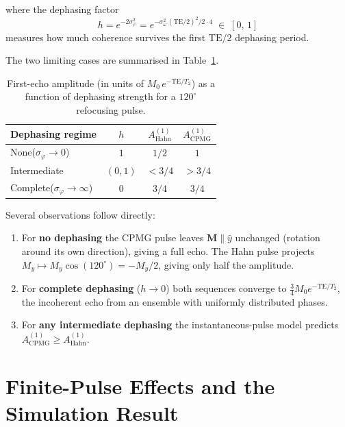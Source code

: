 \documentclass[11pt, a4paper]{article}
\begin{document}
where the dephasing factor
\begin{equation}
  h = e^{-2\sigma_\varphi^2} = e^{-\sigma_\omega^2\,(\mathrm{TE}/2)^2/2 \cdot 4}
    \;\in\; [0,\,1]
\end{equation}
measures how much coherence survives the first $\mathrm{TE}/2$ dephasing period.

The two limiting cases are summarised in Table~\ref{tab:limits}.

\begin{table}[h]
  \centering
  \caption{First-echo amplitude (in units of $M_0\,e^{-\mathrm{TE}/T_2}$) as a function
           of dephasing strength for a $120^\circ$ refocusing pulse.}
  \label{tab:limits}
  \begin{tabular}{lccc}
    \toprule
    Dephasing regime & $h$ & $A_{\mathrm{Hahn}}^{(1)}$ & $A_{\mathrm{CPMG}}^{(1)}$ \\
    \midrule
    None\quad($\sigma_\varphi \to 0$) & $1$ & $1/2$ & $1$ \\
    Intermediate & $(0,1)$ & $< 3/4$ & $> 3/4$ \\
    Complete\quad($\sigma_\varphi \to \infty$) & $0$ & $3/4$ & $3/4$ \\
    \bottomrule
  \end{tabular}
\end{table}

Several observations follow directly:
\begin{enumerate}
  \item For \textbf{no dephasing} the CPMG pulse leaves $\mathbf{M}\!\parallel\!\hat{y}$
        unchanged (rotation around its own direction), giving a full echo.  The Hahn pulse
        projects $M_y \mapsto M_y\cos(120^\circ) = -M_y/2$, giving only half the amplitude.
  \item For \textbf{complete dephasing} ($h\to 0$) both sequences converge to
        $\tfrac{3}{4}M_0 e^{-\mathrm{TE}/T_2}$, the incoherent echo from an ensemble with
        uniformly distributed phases.
  \item For \textbf{any intermediate dephasing} the instantaneous-pulse model predicts
        $A_{\mathrm{CPMG}}^{(1)} \geq A_{\mathrm{Hahn}}^{(1)}$.
\end{enumerate}

\section{Finite-Pulse Effects and the Simulation Result}
\end{document}
